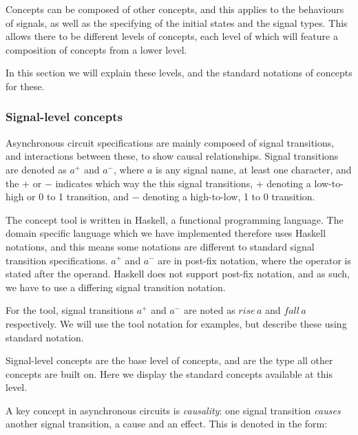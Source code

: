 \documentclass[british,conference,compsoc]{IEEEtran}
\begin{document}
\vspace{-3mm}

Concepts can be composed of other concepts, and this applies to the behaviours 
of signals, as well as the specifying of the initial states and the signal 
types. This allows there to be different levels of concepts, each level of 
which will feature a composition of concepts from a lower level. 

In this section we will explain these levels, and the standard notations of 
concepts for these. 

\vspace{-2mm}

\subsubsection{\label{signal-level}Signal-level concepts}Asynchronous circuit 
specifications are mainly composed of signal transitions, and interactions 
between these, to show causal relationships. Signal transitions are denoted as 
$a^{+}$ and $a^{-}$, where $a$ is any signal name, at least one character, and 
the $+$ or $-$ indicates which way the this signal transitions, $+$ denoting a 
low-to-high or 0 to 1 transition, and $-$ denoting a high-to-low, 1 to 0 
transition. 

The concept tool is written in Haskell, a functional programming language. The 
domain specific language which we have implemented therefore uses Haskell 
notations, and this means some notations are different to standard signal 
transition specifications. $a^{+}$ and $a^{-}$ are in post-fix notation, where 
the operator is stated after the operand. Haskell does not support post-fix 
notation, and as such, we have to use a differing signal transition notation. 

For the tool, signal transitions $a^{+}$ and $a^{-}$ are noted as $rise\,a$ and 
$fall\,a$ respectively. We will use the tool notation for examples, but 
describe these using standard notation.

Signal-level concepts are the base level of concepts, and are 
the type all other concepts are built on. Here we display the standard concepts
available at this level.

A key concept in asynchronous circuits is \emph{causality}:
one signal transition \emph{causes} another signal transition, a cause and an 
effect. This is denoted in the form: 

\vspace{-3mm}
\end{document}
